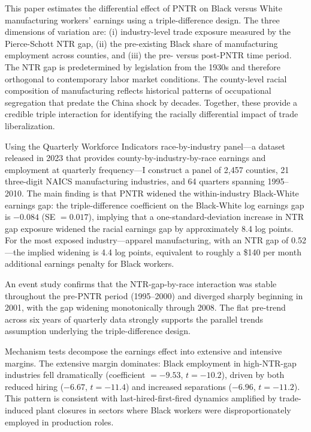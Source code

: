 \documentclass[12pt]{article}
\begin{document}
This paper estimates the differential effect of PNTR on Black versus White manufacturing workers' earnings using a triple-difference design. The three dimensions of variation are: (i) industry-level trade exposure measured by the Pierce-Schott NTR gap, (ii) the pre-existing Black share of manufacturing employment across counties, and (iii) the pre- versus post-PNTR time period. The NTR gap is predetermined by legislation from the 1930s and therefore orthogonal to contemporary labor market conditions. The county-level racial composition of manufacturing reflects historical patterns of occupational segregation that predate the China shock by decades. Together, these provide a credible triple interaction for identifying the racially differential impact of trade liberalization.

Using the Quarterly Workforce Indicators race-by-industry panel---a dataset released in 2023 that provides county-by-industry-by-race earnings and employment at quarterly frequency---I construct a panel of 2,457 counties, 21 three-digit NAICS manufacturing industries, and 64 quarters spanning 1995--2010. The main finding is that PNTR widened the within-industry Black-White earnings gap: the triple-difference coefficient on the Black-White log earnings gap is $-0.084$ (SE $= 0.017$), implying that a one-standard-deviation increase in NTR gap exposure widened the racial earnings gap by approximately 8.4 log points. For the most exposed industry---apparel manufacturing, with an NTR gap of 0.52---the implied widening is 4.4 log points, equivalent to roughly a \$140 per month additional earnings penalty for Black workers.

An event study confirms that the NTR-gap-by-race interaction was stable throughout the pre-PNTR period (1995--2000) and diverged sharply beginning in 2001, with the gap widening monotonically through 2008. The flat pre-trend across six years of quarterly data strongly supports the parallel trends assumption underlying the triple-difference design.

Mechanism tests decompose the earnings effect into extensive and intensive margins. The extensive margin dominates: Black employment in high-NTR-gap industries fell dramatically (coefficient $= -9.53$, $t = -10.2$), driven by both reduced hiring ($-6.67$, $t = -11.4$) and increased separations ($-6.96$, $t = -11.2$). This pattern is consistent with last-hired-first-fired dynamics amplified by trade-induced plant closures in sectors where Black workers were disproportionately employed in production roles.
\end{document}
